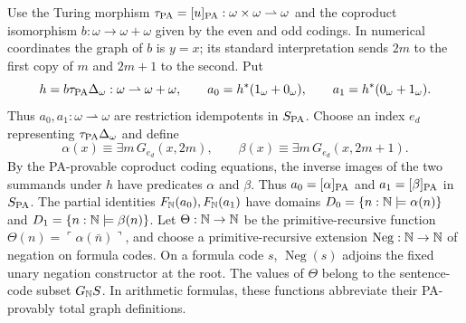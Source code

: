 Use the Turing morphism
$\tau_{\mathrm{PA}}=[u]_{\mathrm{PA}}:\omega\times\omega\rightharpoonup\omega$
and the coproduct isomorphism
$b:\omega\to\omega+\omega$ given by the even and odd codings.
In numerical coordinates the graph of $b$ is $y=x$; its standard
interpretation sends $2m$ to the first copy of $m$ and $2m+1$
to the second. Put
\[
 h=b\tau_{\mathrm{PA}}\Delta_\omega:\omega\rightharpoonup\omega+\omega,
 \qquad
 a_0=h^*(1_\omega+0_\omega),\qquad
 a_1=h^*(0_\omega+1_\omega).
\]
Thus $a_0,a_1:\omega\rightharpoonup\omega$ are restriction
idempotents in $S_{\mathrm{PA}}$.
Choose an index $e_d$ representing
$\tau_{\mathrm{PA}}\Delta_\omega$ and define
\[
 \alpha(x)\equiv\exists m\,G_{e_d}(x,2m),\qquad
 \beta(x)\equiv\exists m\,G_{e_d}(x,2m+1).
\]
By the PA-provable coproduct coding equations, the inverse images
of the two summands under $h$ have predicates $\alpha$ and $\beta$.
Thus $a_0=[\alpha]_{\mathrm{PA}}$ and $a_1=[\beta]_{\mathrm{PA}}$ in $S_{\mathrm{PA}}$.
The partial identities $F_{\mathbb N}(a_0),F_{\mathbb N}(a_1)$ have domains
$D_0=\{n:\mathbb N\models\alpha(n)\}$ and
$D_1=\{n:\mathbb N\models\beta(n)\}$.
Let $\Theta:\mathbb N\to\mathbb N$ be the primitive-recursive function
$\Theta(n)=\ulcorner\alpha(\bar n)\urcorner$, and choose a
primitive-recursive extension $\operatorname{Neg}:\mathbb N\to\mathbb N$
of negation on formula codes. On a formula code $s$,
$\operatorname{Neg}(s)$ adjoins the fixed unary negation constructor
at the root. The values of $\Theta$ belong to the sentence-code
subset $G_{\mathbb N}S$.
In arithmetic formulas,
these functions abbreviate their PA-provably total graph definitions.

